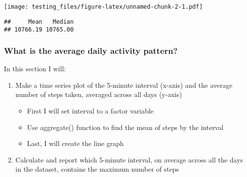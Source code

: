 \documentclass[]{article}
\newenvironment{Shaded}{\begin{snugshade}}{\end{snugshade}}
\newcommand{\KeywordTok}[1]{\textcolor[rgb]{0.13,0.29,0.53}{\textbf{#1}}}
\newcommand{\DataTypeTok}[1]{\textcolor[rgb]{0.13,0.29,0.53}{#1}}
\newcommand{\DecValTok}[1]{\textcolor[rgb]{0.00,0.00,0.81}{#1}}
\newcommand{\StringTok}[1]{\textcolor[rgb]{0.31,0.60,0.02}{#1}}
\newcommand{\CommentTok}[1]{\textcolor[rgb]{0.56,0.35,0.01}{\textit{#1}}}
\newcommand{\OtherTok}[1]{\textcolor[rgb]{0.56,0.35,0.01}{#1}}
\newcommand{\OperatorTok}[1]{\textcolor[rgb]{0.81,0.36,0.00}{\textbf{#1}}}
\newcommand{\NormalTok}[1]{#1}
\providecommand{\tightlist}{%
  \setlength{\itemsep}{0pt}\setlength{\parskip}{0pt}}
\begin{document}
\texttt{[image: testing\_files/figure-latex/unnamed-chunk-2-1.pdf]}

\begin{Shaded}
\end{Shaded}

\begin{verbatim}
##     Mean   Median 
## 10766.19 10765.00
\end{verbatim}

\subsubsection{What is the average daily activity
pattern?}\label{what-is-the-average-daily-activity-pattern}

In this section I will:

\begin{enumerate}
\def\labelenumi{\arabic{enumi}.}
\tightlist
\item
  Make a time series plot of the 5-minute interval (x-axis) and the
  average number of steps taken, averaged across all days (y-axis)

  \begin{itemize}
  \tightlist
  \item
    First I will set interval to a factor variable
  \item
    Use aggregate() function to find the mean of steps by the interval
  \item
    Last, I will create the line graph
  \end{itemize}
\item
  Calculate and report which 5-minute interval, on average across all
  the days in the dataset, contains the maximum number of steps
\end{enumerate}
\end{document}
